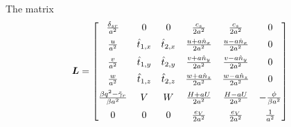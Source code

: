 The matrix 
\Large
\begin{equation}
\bt{L}=
\begin{bmatrix}
  \frac{\delta_{sr}}{a^2}                         & 0             & 0            & \frac{c_s}{2a^2}          & \frac{c_s}{2a^2}          & 0 \vspace{.5em} \\
  \frac{u}{a^2}                                   & \hat{t}_{1,x} & \hat{t}_{2,x} & \frac{u+a\hat{n}_x}{2a^2} & \frac{u-a\hat{n}_x}{2a^2} & 0 \vspace{.5em} \\
  \frac{v}{a^2}                                   & \hat{t}_{1,y} & \hat{t}_{2,y} & \frac{v+a\hat{n}_y}{2a^2} & \frac{v-a\hat{n}_y}{2a^2} & 0 \vspace{.5em} \\ 
  \frac{w}{a^2}                                   & \hat{t}_{1,z} & \hat{t}_{2,z} & \frac{w+a\hat{n}_z}{2a^2} & \frac{w-a\hat{n}_z}{2a^2} & 0 \vspace{.5em} \\
  \frac{\beta q^2 - \tilde{\gamma}_r}{\beta a^2}  & V             & W            & \frac{H+aU}{2a^2}         & \frac{H-aU}{2a^2}        & -\frac{\phi}{\beta a^2} \vspace{.5em} \\
  0                                               & 0             & 0            & \frac{e_V}{2a^2}          & \frac{e_V}{2a^2}         & \frac{1}{a^2}
\end{bmatrix}
\label{eq:eigen_decomposition_L}
\end{equation}
\normalsize

